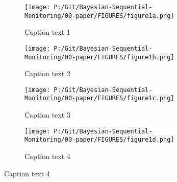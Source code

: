 \documentclass[12pt]{article}
\begin{document}
\begin{figure}
  \begin{subfigure}{6cm}
    \centering\texttt{[image: P:/Git/Bayesian-Sequential-Monitoring/00-paper/FIGURES/figure1a.png]}
    \caption{Caption text 1}
  \end{subfigure}
  \begin{subfigure}{6cm}
    \centering\texttt{[image: P:/Git/Bayesian-Sequential-Monitoring/00-paper/FIGURES/figure1b.png]}
    \caption{Caption text 2}
  \end{subfigure}
 
  \begin{subfigure}{6cm}
    \centering\texttt{[image: P:/Git/Bayesian-Sequential-Monitoring/00-paper/FIGURES/figure1c.png]}
    \caption{Caption text 3}
  \end{subfigure}
  \begin{subfigure}{6cm}
    \centering\texttt{[image: P:/Git/Bayesian-Sequential-Monitoring/00-paper/FIGURES/figure1d.png]}
    \caption{Caption text 4}
  \end{subfigure}
\end{figure}
 
%


\end{document}
